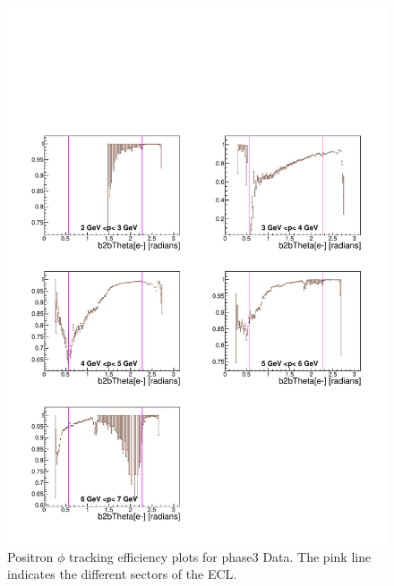 \documentclass[a4paper,11pt,twosided,final,german,openbib,pdftex,listof=totoc,bibliography=totoc]{scrbook}
\begin{document}
\begin{appendix}
\begin{figure}[!htbp]
	\centering
	\includegraphics[width=\textwidth]{Plots/master3/xPMThetaep_DataP3}
	\caption[Momentum $\theta$ Positron Efficiency Phase3 Data]{Positron $\phi$ tracking efficiency plots for phase3 Data. The pink line indicates the different sectors of the ECL.}
	\label{plt:PMThetaep3_Data}
\end{figure}


\clearpage




\end{appendix}
\end{document}
